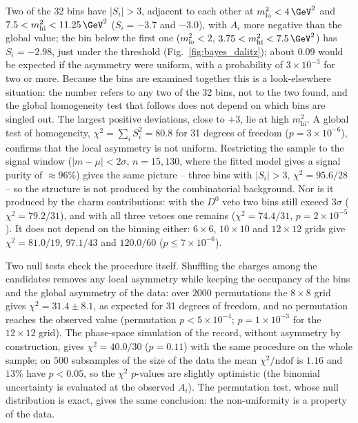 Two of the 32 bins have $|S_i|>3$, adjacent to each other at $m^2_{\mathrm{lo}}<4\,\GeV^2$ and $7.5<m^2_{\mathrm{hi}}<11.25\,\GeV^2$ ($S_i=-3.7$ and $-3.0$), with $A_i$ more negative than the global value; the bin below the first one ($m^2_{\mathrm{lo}}<2$, $3.75<m^2_{\mathrm{hi}}<7.5\,\GeV^2$) has $S_i=-2.98$, just under the threshold (Fig.~\ref{fig:bayes_dalitz}); about $0.09$ would be expected if the asymmetry were uniform, with a probability of $3\times10^{-3}$ for two or more. Because the bins are examined together this is a look-elsewhere situation: the number refers to any two of the $32$ bins, not to the two found, and the global homogeneity test that follows does not depend on which bins are singled out. The largest positive deviations, close to $+3$, lie at high $m^2_{\mathrm{hi}}$. A global test of homogeneity, $\chi^2=\sum_i S_i^2=80.8$ for 31 degrees of freedom ($p=3\times10^{-6}$), confirms that the local asymmetry is not uniform. Restricting the sample to the signal window ($|m-\mu|<2\sigma$, $n=15{,}130$, where the fitted model gives a signal purity of $\approx$96\%) gives the same picture -- three bins with $|S_i|>3$, $\chi^2=95.6/28$ -- so the structure is not produced by the combinatorial background. Nor is it produced by the charm contributions: with the $D^0$ veto two bins still exceed $3\sigma$ ($\chi^2=79.2/31$), and with all three vetoes one remains ($\chi^2=74.4/31$, $p=2\times10^{-5}$). It does not depend on the binning either: $6\times6$, $10\times10$ and $12\times12$ grids give $\chi^2=81.0/19$, $97.1/43$ and $120.0/60$ ($p\leq7\times10^{-6}$).

Two null tests check the procedure itself. Shuffling the charges among the candidates removes any local asymmetry while keeping the occupancy of the bins and the global asymmetry of the data: over $2000$ permutations the $8\times8$ grid gives $\chi^2=31.4\pm8.1$, as expected for 31 degrees of freedom, and no permutation reaches the observed value (permutation $p<5\times10^{-4}$; $p=1\times10^{-3}$ for the $12\times12$ grid). The phase-space simulation of the record, without asymmetry by construction, gives $\chi^2=40.0/30$ ($p=0.11$) with the same procedure on the whole sample; on $500$ subsamples of the size of the data the mean $\chi^2/\mathrm{ndof}$ is $1.16$ and $13\%$ have $p<0.05$, so the $\chi^2$ $p$-values are slightly optimistic (the binomial uncertainty is evaluated at the observed $A_i$). The permutation test, whose null distribution is exact, gives the same conclusion: the non-uniformity is a property of the data.

